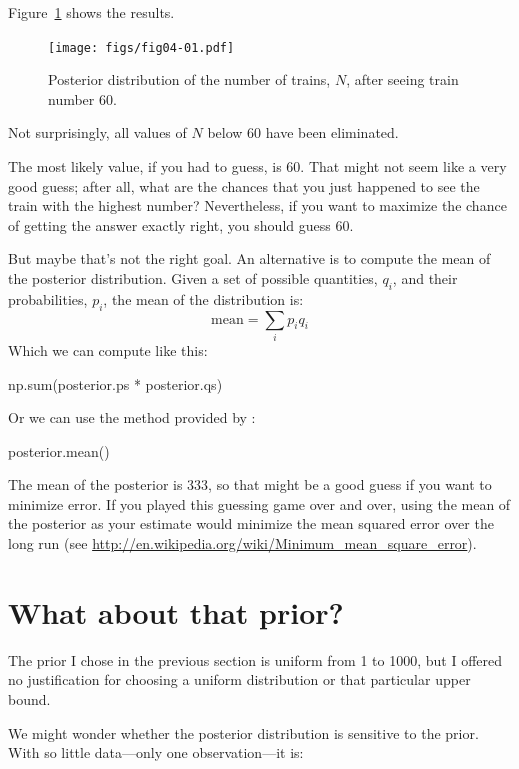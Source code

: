 \documentclass[12pt]{book}
\theoremstyle{exercise}
\begin{document}
Figure~\ref{fig04-01} shows the results.
 
\begin{figure}
\centerline{\texttt{[image: figs/fig04-01.pdf]}}
\caption{Posterior distribution of the number of trains, $N$, after seeing train number 60.}
\label{fig04-01}
\end{figure}

Not surprisingly, all values of $N$ below 60 have been eliminated.

The most likely value, if you had to guess, is 60.  
That might not seem like a very good guess; after all, what are the chances that you just happened to see the train with the highest number?
Nevertheless, if you want to maximize the chance of getting
the answer exactly right, you should guess 60.

But maybe that's not the right goal.  
An alternative is to compute the mean of the posterior distribution.
Given a set of possible quantities, $q_i$, and their probabilities, $p_i$, the mean of the distribution is:
%
\[ \mathrm{mean} = \sum_i p_i q_i \]
%
Which we can compute like this:

\begin{code}
np.sum(posterior.ps * posterior.qs)
\end{code}

Or we can use the method provided by :

\begin{code}
posterior.mean()
\end{code}

The mean of the posterior is 333, so that might be a good guess if you want to minimize error.  
If you played this guessing game over and over, using the mean of the posterior as your estimate would minimize the mean squared error over the long run (see \url{http://en.wikipedia.org/wiki/Minimum_mean_square_error}).



\section{What about that prior?}

The prior I chose in the previous section is uniform from 1 to 1000, but I offered no justification for choosing a uniform distribution or that particular upper bound.


We might wonder whether the posterior distribution is sensitive to the prior.  
With so little data---only one observation---it is:
\end{document}
